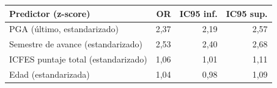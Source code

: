 \begin{tabular}{lrrr}
\toprule
\textbf{Predictor (z-score)} & \textbf{OR} & \textbf{IC95 inf.} & \textbf{IC95 sup.} \\
\midrule
PGA (último, estandarizado) & 2,37 & 2,19 & 2,57 \\
Semestre de avance (estandarizado) & 2,53 & 2,40 & 2,68 \\
ICFES puntaje total (estandarizado) & 1,06 & 1,01 & 1,11 \\
Edad (estandarizada) & 1,04 & 0,98 & 1,09 \\
\bottomrule
\end{tabular}
